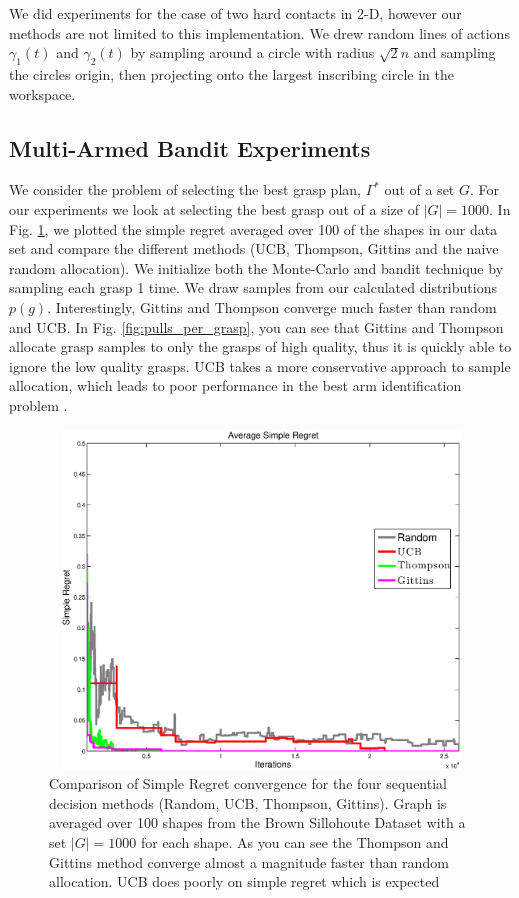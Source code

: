 \documentclass[journal,transmag]{IEEEtran}%
\begin{document}
We did experiments for the case of two hard contacts in 2-D, however our methods are not limited to this implementation. We drew random lines of actions $\gamma_1(t)$ and $\gamma_2(t)$ by sampling around a circle with radius $\sqrt{2}n$ and sampling the circles origin, then projecting onto the largest inscribing circle in the workspace. 


\subsection{Multi-Armed Bandit Experiments}
We consider the problem of selecting the best grasp plan, $\Gamma^*$ out of a set $G$. For our experiments we look at selecting the best grasp out of a size of $|G| = 1000$. In Fig. \ref{fig:simple_regret}, we plotted the simple regret averaged over 100 of the shapes in our data set and compare the different methods (UCB, Thompson, Gittins and the naive random allocation). We initialize both the Monte-Carlo and bandit technique by sampling each grasp 1 time. We draw samples from our calculated distributions $p(g)$.  Interestingly, Gittins and Thompson converge much faster than random and UCB. In Fig. \ref{fig:pulls_per_grasp}, you can see that Gittins and Thompson allocate grasp samples to only the grasps of high quality, thus it is quickly able to ignore the low quality grasps. UCB takes a more conservative approach to sample allocation, which leads to poor performance in the best arm identification problem \cite{bubeck2009pure}.



\begin{figure}[ht!]
\centering
\includegraphics[width = 16.5cm, height = 9cm]{matlab_figures/simple_regret.eps}
\caption{ \footnotesize Comparison of Simple Regret convergence for the four sequential decision methods (Random, UCB, Thompson, Gittins). Graph is averaged over 100 shapes from the Brown Sillohoute Dataset \cite{brown} with a set $|G|=1000$ for each shape. As you can see the Thompson and Gittins method converge almost a magnitude faster than random allocation. UCB does poorly on simple regret which is expected \cite{best_arm}}
\vspace*{-10pt}
\label{fig:simple_regret}
\end{figure}
\end{document}
